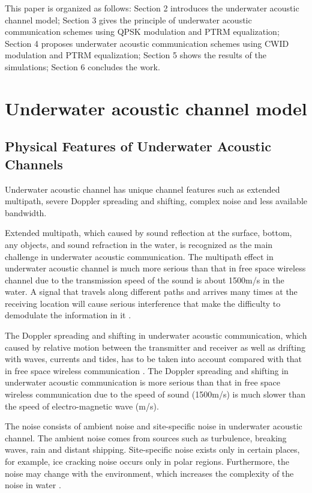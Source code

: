 \documentclass[journal]{IEEEtran}
\begin{document}
This paper is organized as follows: Section 2 introduces the
underwater acoustic channel model; Section 3 gives the principle of
underwater acoustic communication schemes using QPSK modulation and
PTRM equalization; Section 4 proposes underwater acoustic
communication schemes using CWID modulation and PTRM equalization;
Section 5 shows the results of the simulations; Section 6 concludes
the work.
\section{Underwater acoustic channel model}
\subsection{Physical Features of Underwater Acoustic Channels}
Underwater acoustic channel has unique channel features such as
extended multipath, severe Doppler spreading and shifting, complex
noise and less available bandwidth.

Extended multipath, which caused by sound reflection at the surface,
bottom, any objects, and sound refraction in the water, is
recognized as the main challenge in underwater acoustic
communication. The multipath effect in underwater acoustic channel
is much more serious than that in free space wireless channel due to
the transmission speed of the sound is about 1500m/s in the water. A
signal that travels along different paths and arrives many times at
the receiving location will cause serious interference that make the
difficulty to demodulate the information in it
\cite{Du2011,Stojanovic2009}.

The Doppler spreading and shifting in underwater acoustic
communication, which caused by relative motion between the
transmitter and receiver as well as drifting with waves, currents
and tides, has to be taken into account compared with that in free
space wireless communication \cite{Stojanovic2009}. The Doppler
spreading and shifting in underwater acoustic communication is more
serious than that in free space wireless communication due to the
speed of sound (1500m/s) is much slower than the speed of
electro-magnetic wave (m/s).

The noise consists of ambient noise and site-specific noise in
underwater acoustic channel. The ambient noise comes from sources
such as turbulence, breaking waves, rain and distant shipping.
Site-specific noise exists only in certain places, for example, ice
cracking noise occurs only in polar regions. Furthermore, the noise
may change with the environment, which increases the complexity of
the noise in water \cite{Stojanovic2009}.
\end{document}
